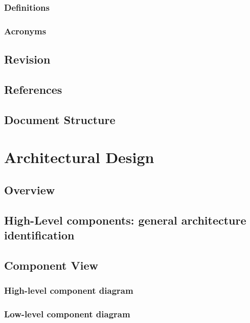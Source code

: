\documentclass[12pt]{article}
\begin{document}
\subsubsection{Definitions}


\subsubsection{Acronyms}


\subsection{Revision}

\subsection{References}


\subsection{Document Structure}

\clearpage

\section{Architectural Design}

\subsection{Overview}

\subsection{High-Level components: general architecture identification}\label{higharch}

\subsection{Component View}\label{componentview}

\clearpage
\subsubsection{High-level component diagram}
\subsubsection{Low-level component diagram}
\end{document}

